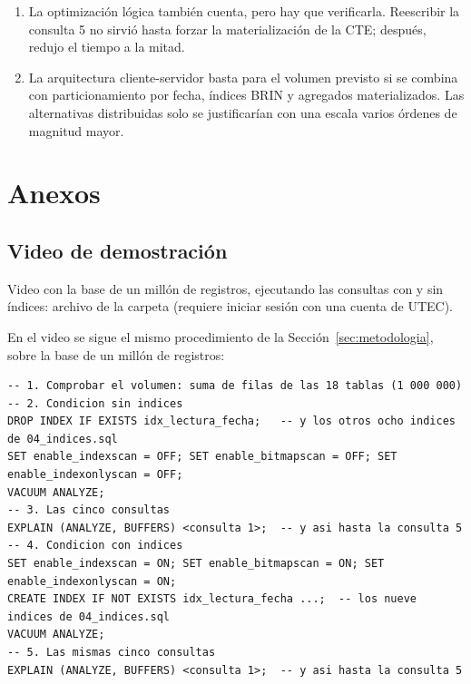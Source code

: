 \begin{enumerate}[leftmargin=1.6em,itemsep=0.25em]
\item La optimización lógica también cuenta, pero hay que verificarla. Reescribir la consulta 5 no sirvió hasta forzar la materialización de la CTE; después, redujo el tiempo a la mitad.
\item La arquitectura cliente-servidor basta para el volumen previsto si se combina con particionamiento por fecha, índices BRIN y agregados materializados. Las alternativas distribuidas solo se justificarían con una escala varios órdenes de magnitud mayor.
\end{enumerate}

\section{Anexos}

\subsection{Video de demostración}

Video con la base de un millón de registros, ejecutando las consultas con y sin índices: archivo  de la carpeta \enlaceVideo{} (requiere iniciar sesión con una cuenta de UTEC).

En el video se sigue el mismo procedimiento de la Sección~\ref{sec:metodologia}, sobre la base de un millón de registros:

\begin{lstlisting}
-- 1. Comprobar el volumen: suma de filas de las 18 tablas (1 000 000)
-- 2. Condicion sin indices
DROP INDEX IF EXISTS idx_lectura_fecha;   -- y los otros ocho indices de 04_indices.sql
SET enable_indexscan = OFF; SET enable_bitmapscan = OFF; SET enable_indexonlyscan = OFF;
VACUUM ANALYZE;
-- 3. Las cinco consultas
EXPLAIN (ANALYZE, BUFFERS) <consulta 1>;  -- y asi hasta la consulta 5
-- 4. Condicion con indices
SET enable_indexscan = ON; SET enable_bitmapscan = ON; SET enable_indexonlyscan = ON;
CREATE INDEX IF NOT EXISTS idx_lectura_fecha ...;  -- los nueve indices de 04_indices.sql
VACUUM ANALYZE;
-- 5. Las mismas cinco consultas
EXPLAIN (ANALYZE, BUFFERS) <consulta 1>;  -- y asi hasta la consulta 5
\end{lstlisting}


